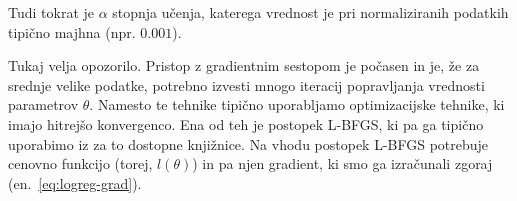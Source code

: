 Tudi tokrat je $\alpha$ stopnja učenja, katerega vrednost je pri normaliziranih podatkih tipično majhna (npr. $0.001$).

Tukaj velja opozorilo. Pristop z gradientnim sestopom je počasen in je, že za srednje velike podatke, potrebno izvesti mnogo iteracij popravljanja vrednosti parametrov $\theta$. Namesto te tehnike tipično uporabljamo optimizacijske tehnike, ki imajo hitrejšo konvergenco. Ena od teh je postopek L-BFGS, ki pa ga tipično uporabimo iz za to dostopne knjižnice. Na vhodu postopek L-BFGS potrebuje cenovno funkcijo (torej, $l(\theta)$) in pa njen gradient, ki smo ga izračunali zgoraj (en.~\ref{eq:logreg-grad}).

